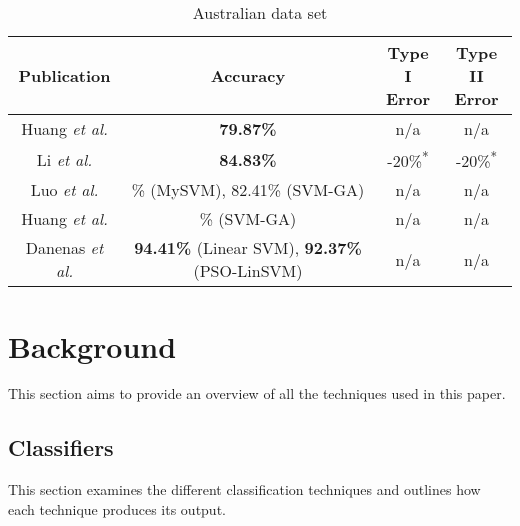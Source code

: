 \documentclass{sig-alternate-05-2015}
\begin{document}
	\begin{table}
		\small
		\caption{Australian data set\textsuperscript{\textparagraph}}
		\label{table:australian_dataset}	
		\begin{tabular}{c|c|c|c} \hline		
			Publication&Accuracy&\parbox[t]{1.2cm}{\centering Type I\\Error}&\parbox[t]{1.2cm}{\centering Type II\\Error}\rule{0pt}{3mm}\rule[-0mm]{0pt}{0pt}\\ \hline
			\parbox[t]{2.3cm}{Huang \textit{et al.} \cite{Huang2004543}}
			&\parbox[t]{2.3cm}{\centering \textbf{79.87\%}\textsuperscript{\textdagger}}
			&\parbox[t]{1.1cm}{\centering n/a}
			&\parbox[t]{1.2cm}{\centering n/a}\rule{0pt}{3.5mm}\rule[-0mm]{0pt}{0pt}\\ \hline
			\parbox[t]{2.3cm}{Li \textit{et al.} \cite{Li2006772}}
			&\parbox[t]{2.3cm}{\centering \textbf{84.83\%}}
			&\parbox[t]{1.1cm}{-20\%\textsuperscript{*}}
			&\parbox[t]{1.2cm}{-20\%\textsuperscript{*}}\\ \hline
			\parbox[t]{2.3cm}{Luo \textit{et al.} \cite{Luo20097562}}
			&\parbox[t]{2.3cm}{\% (MySVM), 82.41\% (SVM-GA)\textsuperscript{\textdagger}}
			&\parbox[t]{1.1cm}{\centering n/a}
			&\parbox[t]{1.2cm}{\centering n/a}\rule{0pt}{3.5mm}\rule[-0mm]{0pt}{0pt}\\ \hline
			\parbox[t]{2.3cm}{Huang \textit{et al.} \cite{Huang2007847}}
			&\parbox[t]{2.3cm}{\% (SVM-GA)\textsuperscript{\textdagger}}
			&\parbox[t]{1.1cm}{\centering n/a}
			&\parbox[t]{1.2cm}{\centering n/a}\rule{0pt}{3.5mm}\rule[-0mm]{0pt}{0pt}\\ \hline
			\parbox[t]{2.3cm}{Danenas \textit{et al.} \cite{Danenas20153194}}
			&\parbox[t]{2.3cm}{\centering \textbf{94.41\%} (Linear SVM), \textbf{92.37\%} (PSO-LinSVM)\textsuperscript{\textdagger}}
			&\parbox[t]{1.1cm}{\centering n/a\textsuperscript{\textdaggerdbl}}
			&\parbox[t]{1.2cm}{\centering n/a\textsuperscript{\textdaggerdbl}}\rule{0pt}{3.5mm}\rule[-8mm]{0pt}{0pt}		
		\end{tabular}		
	\end{table}

	
	\section{Background}
	This section aims to provide an overview of all the techniques used in this paper.
	\subsection{Classifiers}
	This section examines the different classification techniques and outlines how each technique produces its output.
\end{document}
